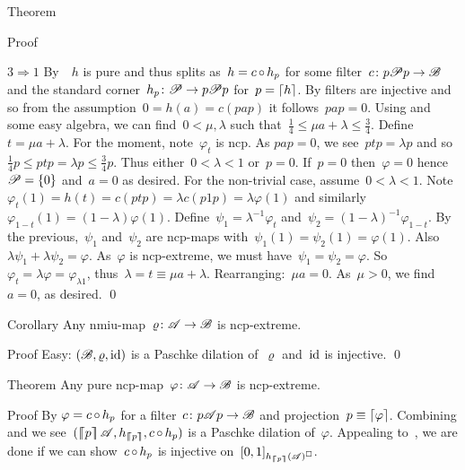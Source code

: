 \documentclass[b]{subfiles}
\begin{document}
\begin{parsec}
\begin{point}{Theorem}
\begin{point}{Proof}
\begin{point}{$3 \Rightarrow 1$}
By~~$h$ is pure
    and thus splits as~$h = c \mathop{\circ} h_p$
    for some filter~$c \colon p\mathscr{P} p \to \mathscr{B}$
    and the standard corner~$h_p\colon \mathscr{P} \to p\mathscr{P} p$
    for~$p = \left\lceil h\right\rceil$.
By  filters are injective
    and so from the assumption~$0 = h(a) = c(pap)$
    it follows~$pap = 0$.
Using  and some easy algebra,
    we can find~$0 < \mu,\lambda$
    such that~$\frac{1}{4} \leq \mu a + \lambda \leq \frac{3}{4}$.
Define~$t = \mu a + \lambda$.
For the moment, note~$\varphi_t$ is ncp.
As $pap = 0$, we see~$ptp = \lambda p$ and
so~$\frac{1}{4} p \leq  ptp = \lambda p
    \leq \frac{3}{4} p$.
Thus either~$0 < \lambda < 1$ or~$p = 0$.
If~$p = 0$ then~$\varphi=0$ hence~$\mathscr{P} = \{0\}$
    and~$a = 0$ as desired.
For the non-trivial case, assume~$0 < \lambda <1$.
Note~$\varphi_t(1) = h(t) = c(ptp) = \lambda c(p1p) = \lambda \varphi(1)$
    and similarly~$\varphi_{1-t}(1) = (1-\lambda) \varphi(1)$.
Define~$\psi_1 = \lambda^{-1} \varphi_t$
and~$\psi_2 = (1-\lambda)^{-1}\varphi_{1-t}$.
By the previous,~$\psi_1$ and~$\psi_2$ are ncp-maps
    with~$\psi_1(1)=\psi_2(1)=\varphi(1)$.
Also~$\lambda \psi_1 + \lambda \psi_2 = \varphi$.
As~$\varphi$ is ncp-extreme,
    we must have~$\psi_1 = \psi_2 = \varphi$.
So~$\varphi_t = \lambda \varphi = \varphi_{\lambda 1}$,
    thus~$\lambda = t \equiv \mu a + \lambda$.
    Rearranging:~$\mu a = 0$.
    As~$\mu > 0$, we find~$a=0$, as desired. \qed
\end{point}
\end{point}
\end{point}
\begin{point}{Corollary}%
Any nmiu-map~$\varrho\colon \mathscr{A} \to \mathscr{B}$ is ncp-extreme. 
\begin{point}{Proof}%
Easy: $(\mathscr{B}, \varrho, \operatorname{id})$ is a Paschke dilation of~$\varrho$
and~$\operatorname{id}$ is injective.  \qed
\end{point}
\end{point}
\begin{point}{Theorem}%
Any pure ncp-map~$\varphi\colon \mathscr{A} \to \mathscr{B}$ is ncp-extreme.
\begin{point}{Proof}%
By  $\varphi = c \mathop{\circ} h_p$
    for a filter~$c\colon p\mathscr{A} p \to \mathscr{B}$
    and projection~$p \equiv \left\lceil\varphi\right\rceil$.
Combining  and 
    we see~$(\cceil{p}\scrA, h_{\cceil{p}}, c\after h_p)$
    is a Paschke dilation of~$\varphi$.
Appealing to~,
    we are done if we can show~$c \mathop{\circ} h_p$
    is injective on~$[0,1]_{h_{\left\lceil\!\!\left\lceil p\right\rceil\!\!\right\rceil}(\mathscr{A})^\square}$.

\end{point}
\end{point}
\end{parsec}
\end{document}
